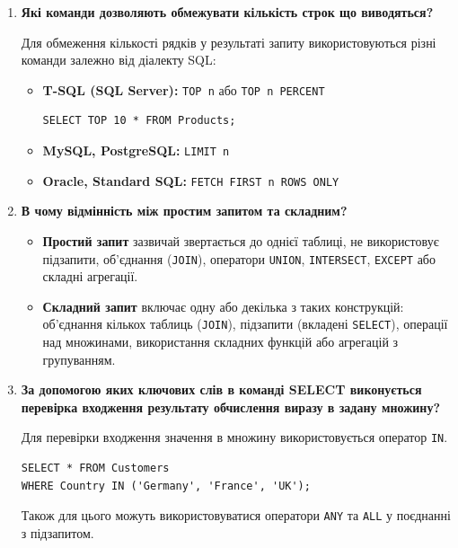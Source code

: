 \documentclass{article}
\begin{document}
\begin{enumerate}[label=\arabic*., leftmargin=*]
        \item \textbf{Які команди дозволяють обмежувати кількість строк що виводяться?}
        
        Для обмеження кількості рядків у результаті запиту використовуються різні команди залежно від діалекту SQL:
        \begin{itemize}
            \item \textbf{T-SQL (SQL Server):} \texttt{TOP n} або \texttt{TOP n PERCENT}
            \begin{CodeBox}[Приклад]
                \begin{verbatim}
SELECT TOP 10 * FROM Products;
                \end{verbatim}
            \end{CodeBox}
            \item \textbf{MySQL, PostgreSQL:} \texttt{LIMIT n}
            \item \textbf{Oracle, Standard SQL:} \texttt{FETCH FIRST n ROWS ONLY}
        \end{itemize}
        
        \item \textbf{В чому відмінність між простим запитом та складним?}
        
        \begin{itemize}
            \item \textbf{Простий запит} зазвичай звертається до однієї таблиці, не використовує підзапити, об'єднання (\texttt{JOIN}), оператори \texttt{UNION}, \texttt{INTERSECT}, \texttt{EXCEPT} або складні агрегації.
            \item \textbf{Складний запит} включає одну або декілька з таких конструкцій: об'єднання кількох таблиць (\texttt{JOIN}), підзапити (вкладені \texttt{SELECT}), операції над множинами, використання складних функцій або агрегацій з групуванням.
        \end{itemize}
        
        \item \textbf{За допомогою яких ключових слів в команді SELECT виконується перевірка входження результату обчислення виразу в задану множину?}
        
        Для перевірки входження значення в множину використовується оператор \texttt{IN}.
        \begin{CodeBox}[Приклад з IN]
        \begin{verbatim}
SELECT * FROM Customers
WHERE Country IN ('Germany', 'France', 'UK');
        \end{verbatim}
        \end{CodeBox}
        Також для цього можуть використовуватися оператори \texttt{ANY} та \texttt{ALL} у поєднанні з підзапитом.


\end{enumerate}
\end{document}
